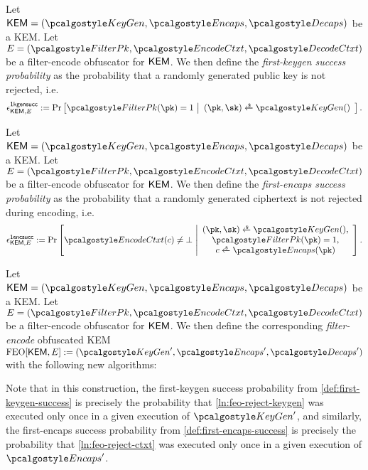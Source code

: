 \begin{definition}
\label{def:first-keygen-success}
    Let $\KEM = (\kgen, \encaps, \decaps)$ be a KEM.
    Let $E = (\filterpk, \encodectxt, \decodectxt)$ be a filter-encode obfuscator for $\mathsf{KEM}$.
    We then define the \emph{first-keygen success probability} as the probability that a randomly generated public key is not rejected, i.e.
    \[
        \epsilon^\firstkeygensuccess_{\KEM,E} :=
        \Pr\left[
            \filterpk(\pk) = 1
        ~\middle|
            \begin{array}{c}
                (\pk, \sk) \getsr \kgen()
            \end{array}
        \right].
    \]
\end{definition}

\begin{definition}
\label{def:first-encaps-success}
    Let $\KEM = (\kgen, \encaps, \decaps)$ be a KEM.
    Let $E = (\filterpk, \encodectxt, \decodectxt)$ be a filter-encode obfuscator for $\mathsf{KEM}$.
    We then define the \emph{first-encaps success probability} as the probability that a randomly generated ciphertext is not rejected during encoding, i.e.
    \[
        \epsilon^\firstencapssuccess_{\KEM,E} :=
        \Pr\left[
            \encodectxt(c) \neq \bot
        ~\middle|
            \begin{array}{c}
                (\pk, \sk) \getsr \kgen(), \\
                \filterpk(\pk) = 1, \\
                c \getsr \encaps(\pk)
            \end{array}
        \right].
    \]
\end{definition}

\begin{definition}
\label{def:filter-encode-okem}
    Let $\KEM = (\kgen, \encaps, \decaps)$ be a KEM.
    Let $E = (\filterpk, \encodectxt, \decodectxt)$ be a filter-encode obfuscator for $\mathsf{KEM}$.
    We then define the corresponding \emph{filter-encode} obfuscated KEM $\feo[\KEM, E] := (\kgen', \encaps', \decaps')$ with the following new algorithms:

    
\end{definition}

Note that in this construction, the first-keygen success probability from \cref{def:first-keygen-success} is precisely the probability that \cref{ln:feo-reject-keygen} was executed only once in a given execution of $\kgen'$, and similarly, the first-encaps success probability from \cref{def:first-encaps-success} is precisely the probability that \cref{ln:feo-reject-ctxt} was executed only once in a given execution of $\encaps'$.

